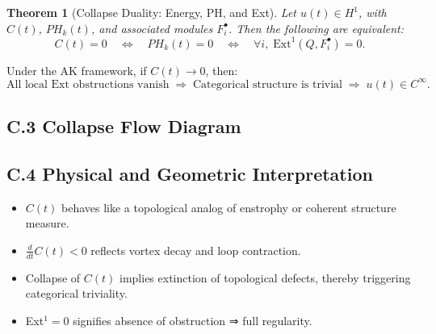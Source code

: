 \documentclass[11pt]{article}
\newtheorem{theorem}{Theorem}[section]
\begin{document}
\begin{theorem}[Collapse Duality: Energy, PH, and Ext]
Let $u(t) \in H^1$, with $C(t)$, $PH_k(t)$, and associated modules $F^\bullet_i$.  
Then the following are equivalent:
\[
C(t) = 0
\quad \Longleftrightarrow \quad
PH_k(t) = 0
\quad \Longleftrightarrow \quad
\forall i,\; \mathrm{Ext}^1(Q, F^\bullet_i) = 0.
\]
\end{theorem}

\begin{corollary}
Under the AK framework, if $C(t) \to 0$, then:
\[
\text{All local Ext obstructions vanish} \;\Rightarrow\; \text{Categorical structure is trivial} \;\Rightarrow\; u(t) \in C^\infty.
\]
\end{corollary}

\subsection*{C.3 Collapse Flow Diagram}

\begin{center}
\end{center}

\subsection*{C.4 Physical and Geometric Interpretation}

\begin{itemize}
  \item $C(t)$ behaves like a topological analog of enstrophy or coherent structure measure.
  \item $\frac{d}{dt} C(t) < 0$ reflects vortex decay and loop contraction.
  \item Collapse of $C(t)$ implies extinction of topological defects, thereby triggering categorical triviality.
  \item Ext$^1 = 0$ signifies absence of obstruction ⇒ full regularity.
\end{itemize}
\end{document}
